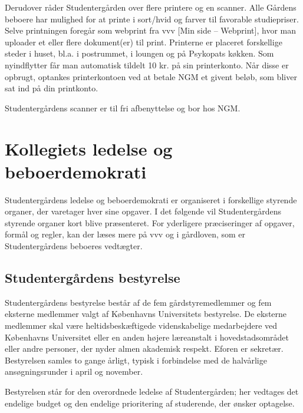 \documentclass[11pt,article,twoside,openany,danish,extrafontsizes]{memoir} %
\begin{document}
Derudover råder Studentergården over flere printere og en scanner. Alle Gårdens beboere har mulighed for at printe i sort/hvid og farver til favorable studiepriser. Selve printningen foregår som webprint fra vvv [Min side -- Webprint], hvor man uploader et eller flere dokument(er) til print. Printerne er placeret forskellige steder i huset, bl.a. i postrummet, i loungen og på Psykopats køkken. Som nyindflytter får man automatisk tildelt 10 kr. på sin printerkonto. Når disse er opbrugt, optankes printerkontoen ved at betale NGM et givent beløb, som bliver sat ind på din printkonto.

Studentergårdens scanner er til fri afbenyttelse og bor hos NGM.



\clearpage



\chapter{Kollegiets ledelse og beboerdemokrati}
\label{chap:demokrati}
Studentergårdens ledelse og beboerdemokrati er organiseret i forskellige styrende organer, der varetager hver sine opgaver. I det følgende vil Studentergårdens styrende organer kort blive præsenteret. For yderligere præciseringer af opgaver, formål og regler, kan der læses mere på vvv og i gårdloven, som er Studentergårdens beboeres vedtægter.



\section{Studentergårdens bestyrelse}
Studentergårdens bestyrelse består af de fem gårdstyremedlemmer og fem eksterne medlemmer valgt af Københavns Universitets bestyrelse. De eksterne medlemmer skal være heltidsbeskæftigede videnskabelige medarbejdere ved Københavns Universitet eller en anden højere læreanstalt i hovedstadsområdet eller andre personer, der nyder almen akademisk respekt. Eforen er sekretær. Bestyrelsen samles to gange årligt, typisk i forbindelse med de halvårlige ansøgningsrunder i april og november.

Bestyrelsen står for den overordnede ledelse af Studentergården; her vedtages det endelige budget og den endelige prioritering af studerende, der ønsker optagelse.
\end{document}
